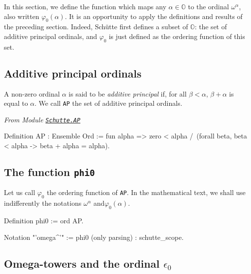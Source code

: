 \documentclass[a4paper]{book}
\begin{document}
{In this section, we define the function which maps any $\alpha\in\mathbb{O}$ to
the ordinal  $\omega^\alpha$, also written 
$\varphi_0(\alpha)$. 
It is an opportunity to apply the definitions and results of the preceding section. 
Indeed,  Schütte first defines a subset of $\mathbb{O}$: the set of additive principal ordinals, and $\varphi_0$  is just defined as the ordering function of this set.

\subsection{Additive principal ordinals}


\begin{definition}
A non-zero ordinal  $\alpha$ is said to be \emph{additive principal} if, for all  $\beta<\alpha$, $\beta+\alpha$ is equal to  $\alpha$.
We call \texttt{AP} the set of additive principal ordinals.

\end{definition}



\noindent\emph{From Module \href{../src/html/hydras.Schutte.AP.html}%
{\texttt{Schutte.AP}}}

\begin{Coqsrc}
Definition AP : Ensemble Ord :=
  fun alpha => 
  zero < alpha /\
  (forall beta, beta < alpha ->  beta + alpha = alpha).
\end{Coqsrc}

\subsection{The function \texttt{phi0}}

Let us call  $\varphi_0$ the ordering function of \texttt{AP}.
In the mathematical text, we shall use indifferently the notations  $\omega^\alpha$ and$\varphi_0(\alpha)$. 


\begin{Coqsrc}
Definition phi0 := ord AP.

Notation "'omega^'" := phi0 (only parsing) : schutte_scope.
\end{Coqsrc}

\subsection{Omega-towers and the ordinal \texorpdfstring{$\epsilon_0$}{epsilon0}}


}
\end{document}

